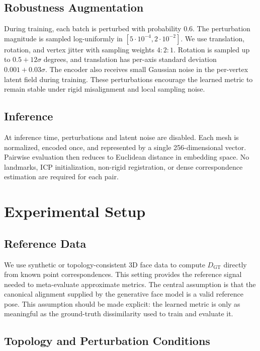 \documentclass{article}
\begin{document}
\subsection{Robustness Augmentation}

During training, each batch is perturbed with probability $0.6$. The perturbation magnitude is sampled log-uniformly in $[5\cdot10^{-4},2\cdot10^{-2}]$. We use translation, rotation, and vertex jitter with sampling weights $4:2:1$. Rotation is sampled up to $0.5 + 12\sigma$ degrees, and translation has per-axis standard deviation $0.001 + 0.03\sigma$. The encoder also receives small Gaussian noise in the per-vertex latent field during training. These perturbations encourage the learned metric to remain stable under rigid misalignment and local sampling noise.

\subsection{Inference}

At inference time, perturbations and latent noise are disabled. Each mesh is normalized, encoded once, and represented by a single 256-dimensional vector. Pairwise evaluation then reduces to Euclidean distance in embedding space. No landmarks, ICP initialization, non-rigid registration, or dense correspondence estimation are required for each pair.

\section{Experimental Setup}

\subsection{Reference Data}

We use synthetic or topology-consistent 3D face data to compute $D_{\mathrm{GT}}$ directly from known point correspondences. This setting provides the reference signal needed to meta-evaluate approximate metrics. The central assumption is that the canonical alignment supplied by the generative face model is a valid reference pose. This assumption should be made explicit: the learned metric is only as meaningful as the ground-truth dissimilarity used to train and evaluate it.

\subsection{Topology and Perturbation Conditions}
\end{document}
